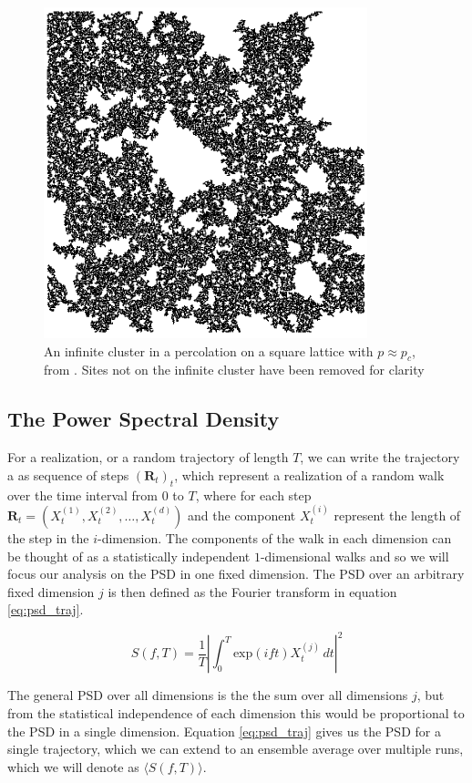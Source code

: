 \documentclass[%
 reprint,
 amsmath,amssymb,
 aps,
]{revtex4-2}
\begin{document}
\begin{figure}
    \centering
    \includegraphics[scale=.6]{perc_infcluster.PNG}
    \caption{An infinite cluster in a percolation on a square lattice with $p\approx p_c$, from \cite{ben-avraham_diffusion_2000}. Sites not on the infinite cluster have been removed for clarity}
    \label{fig:perc}
\end{figure}

\subsection{The Power Spectral Density}
For a realization, or a random trajectory of length $T$, we can write the trajectory a as sequence of steps $(\textbf{R}_t)_t$, which represent a realization of a random walk over the time interval from $0$ to $T$, where for each step $\textbf{R}_t=(X_t^{(1)}, X_t^{(2)},\dots, X_t^{(d)})$ and the component $X_t^{(i)}$ represent the length of the step in the $i$-dimension. The components of the walk in each dimension can be thought of as a statistically independent $1$-dimensional walks and so we will focus our analysis on the PSD in one fixed dimension. The PSD over an arbitrary fixed dimension $j$ is then defined as the Fourier transform in equation \ref{eq:psd_traj}\cite{krapf_spectral_2019}.

\begin{equation}
\label{eq:psd_traj}
    S(f,T)=\frac{1}{T}\left|\int_{0}^T \text{exp}(ift)X^{(j)}_t \, dt\right|^2
\end{equation}

The general PSD over all dimensions is the the sum over all dimensions $j$, but from the statistical independence of each dimension this would be proportional to the PSD in a single dimension. Equation \ref{eq:psd_traj} gives us the PSD for a single trajectory, which we can extend to an ensemble average over multiple runs, which we will denote as $\langle S(f,T)\rangle$.
\end{document}
